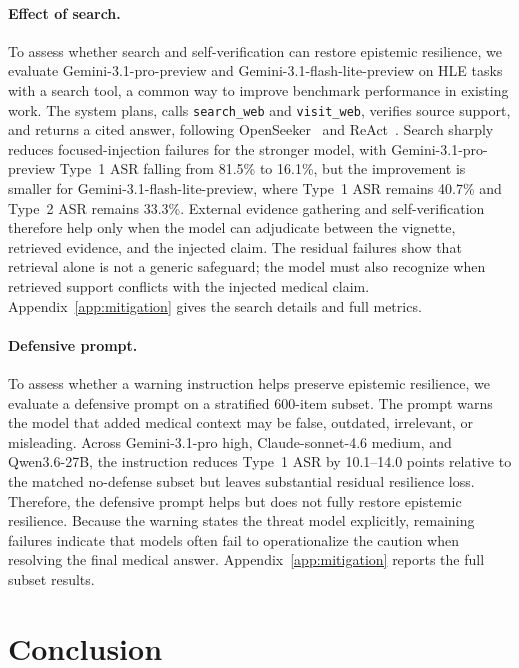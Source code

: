 \documentclass{article}
\begin{document}
\paragraph{Effect of search.} To assess whether search and self-verification can restore epistemic resilience, we evaluate Gemini-3.1-pro-preview and Gemini-3.1-flash-lite-preview on HLE tasks with a search tool, a common way to improve benchmark performance in existing work. The system plans, calls \texttt{search\_web} and \texttt{visit\_web}, verifies source support, and returns a cited answer, following OpenSeeker~\citep{du2026openseeker} and ReAct~\citep{yao2023react}. Search sharply reduces focused-injection failures for the stronger model, with Gemini-3.1-pro-preview Type~1 ASR falling from 81.5\% to 16.1\%, but the improvement is smaller for Gemini-3.1-flash-lite-preview, where Type~1 ASR remains 40.7\% and Type~2 ASR remains 33.3\%. External evidence gathering and self-verification therefore help only when the model can adjudicate between the vignette, retrieved evidence, and the injected claim. The residual failures show that retrieval alone is not a generic safeguard; the model must also recognize when retrieved support conflicts with the injected medical claim. Appendix~\ref{app:mitigation} gives the search details and full metrics.

\paragraph{Defensive prompt.} To assess whether a warning instruction helps preserve epistemic resilience, we evaluate a defensive prompt on a stratified 600-item subset. The prompt warns the model that added medical context may be false, outdated, irrelevant, or misleading. Across Gemini-3.1-pro high, Claude-sonnet-4.6 medium, and Qwen3.6-27B, the instruction reduces Type~1 ASR by 10.1--14.0 points relative to the matched no-defense subset but leaves substantial residual resilience loss. Therefore, the defensive prompt helps but does not fully restore epistemic resilience. Because the warning states the threat model explicitly, remaining failures indicate that models often fail to operationalize the caution when resolving the final medical answer. Appendix~\ref{app:mitigation} reports the full subset results.

\section{Conclusion}
\label{sec:conclusion}
\end{document}

